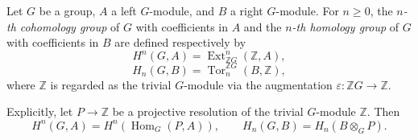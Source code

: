 Let $G$ be a group, $A$ a left $G$-module, and $B$ a right $G$-module. For $n \geq 0$, the \emph{$n$-th cohomology group} of $G$ with coefficients in $A$ and the \emph{$n$-th homology group} of $G$ with coefficients in $B$ are defined respectively by
$$H^n(G, A) = \operatorname{Ext}_{\mathbb{Z}G}^n(\mathbb{Z}, A),$$
$$H_n(G, B) = \operatorname{Tor}_n^{\mathbb{Z}G}(B, \mathbb{Z}),$$
where $\mathbb{Z}$ is regarded as the trivial $G$-module via the augmentation $\varepsilon: \mathbb{Z}G \to \mathbb{Z}$.

Explicitly, let $P \to \mathbb{Z}$ be a projective resolution of the trivial $G$-module $\mathbb{Z}$. Then
$$H^n(G, A) = H^n(\operatorname{Hom}_G(P, A)), \qquad H_n(G, B) = H_n(B \otimes_G P).$$
